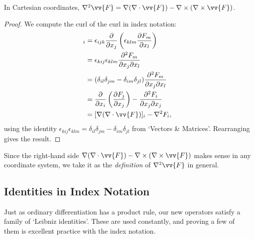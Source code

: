 \begin{proposition}
	In Cartesian coordinates, $\nabla^2 \vv{F} = \nabla(\nabla \cdot \vv{F}) - \nabla \times (\nabla \times \vv{F})$.
\end{proposition}
\begin{proof}
	We compute the curl of the curl in index notation:
	\begin{align*}
		[\nabla \times (\nabla \times \vv{F})]_i &= \epsilon_{ijk} \frac{\partial}{\partial x_j} \left(\epsilon_{klm} \frac{\partial F_m}{\partial x_l}\right) \\
		&= \epsilon_{kij}\epsilon_{klm} \frac{\partial^2 F_m}{\partial x_j \partial x_l} \\
		&= (\delta_{il}\delta_{jm} - \delta_{im}\delta_{jl}) \frac{\partial^2 F_m}{\partial x_j \partial x_l} \\
		&= \frac{\partial}{\partial x_i}\left(\frac{\partial F_j}{\partial x_j}\right) - \frac{\partial^2 F_i}{\partial x_j \partial x_j} \\
		&= [\nabla(\nabla \cdot \vv{F})]_i - \nabla^2 F_i,
	\end{align*}
	using the identity $\epsilon_{kij}\epsilon_{klm} = \delta_{il}\delta_{jm} - \delta_{im}\delta_{jl}$ from `Vectors \& Matrices'. Rearranging gives the result.
\end{proof}

Since the right-hand side $\nabla (\nabla \cdot \vv{F}) - \nabla \times (\nabla \times \vv{F})$ makes sense in any coordinate system, we take it as the \emph{definition} of $\nabla^2 \vv{F}$ in general.

\subsection{Identities in Index Notation}

Just as ordinary differentiation has a product rule, our new operators satisfy a family of `Leibniz identities'. These are used constantly, and proving a few of them is excellent practice with the index notation.

